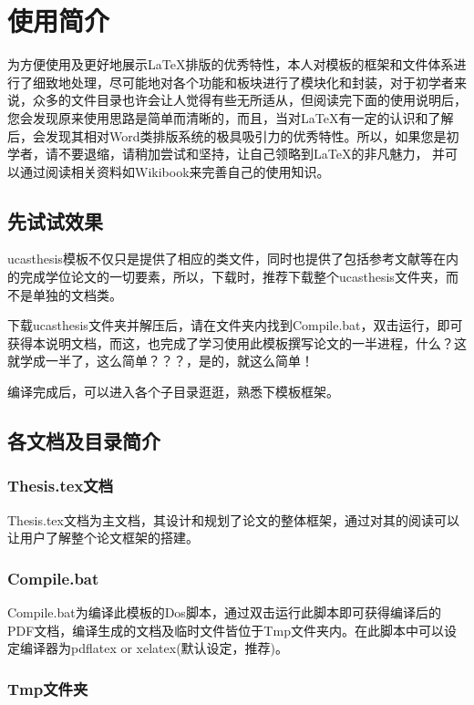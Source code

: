 
\chapter{使用简介}
\label{chap:guide}

为方便使用及更好地展示\LaTeX{}排版的优秀特性，本人对模板的框架和文件体系进行了细致地处理，尽可能地对各个功能和板块进行了模块化和封装，对于初学者来说，众多的文件目录也许会让人觉得有些无所适从，但阅读完下面的使用说明后，您会发现原来使用思路是简单而清晰的，而且，当对\LaTeX{}有一定的认识和了解后，会发现其相对Word类排版系统的极具吸引力的优秀特性。所以，如果您是初学者，请不要退缩，请稍加尝试和坚持，让自己领略到\LaTeX{}的非凡魅力， 并可以通过阅读相关资料如Wikibook\citep{wikibook2014latex}来完善自己的使用知识。

\section{先试试效果}

ucasthesis模板不仅只是提供了相应的类文件，同时也提供了包括参考文献等在内的完成学位论文的一切要素，所以，下载时，推荐下载整个ucasthesis文件夹，而不是单独的文档类。

下载ucasthesis文件夹并解压后，请在文件夹内找到Compile.bat，双击运行，即可获得本说明文档，而这，也完成了学习使用此模板撰写论文的一半进程，什么？这就学成一半了，这么简单？？？，是的，就这么简单！

编译完成后，可以进入各个子目录逛逛，熟悉下模板框架。

\section{各文档及目录简介}

\subsection{Thesis.tex文档 }

Thesis.tex文档为主文档，其设计和规划了论文的整体框架，通过对其的阅读可以让用户了解整个论文框架的搭建。

\subsection{Compile.bat}

Compile.bat为编译此模板的Dos脚本，通过双击运行此脚本即可获得编译后的PDF文档，编译生成的文档及临时文件皆位于Tmp文件夹内。在此脚本中可以设定编译器为pdflatex or xelatex(默认设定，推荐)。

\subsection{Tmp文件夹}

